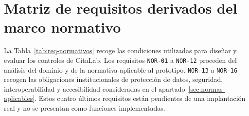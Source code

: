 \section{Matriz de requisitos derivados del marco normativo}

La Tabla~\ref{tab:req-normativos} recoge las condiciones utilizadas para diseñar y evaluar los controles de CitaLab. Los requisitos \texttt{NOR-01} a \texttt{NOR-12} proceden del análisis del dominio y de la normativa aplicable al prototipo. \texttt{NOR-13} a \texttt{NOR-16} recogen las obligaciones institucionales de protección de datos, seguridad, interoperabilidad y accesibilidad consideradas en el apartado~\ref{sec:normas-aplicables}. Estos cuatro últimos requisitos están pendientes de una implantación real y no se presentan como funciones implementadas.

